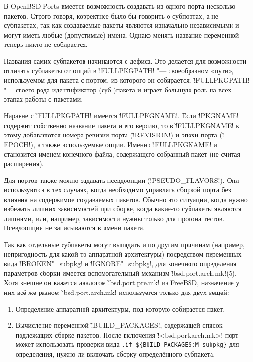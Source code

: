 \documentclass[10pt, a5paper]{article}
\begin{document}
В OpenBSD Ports имеется возможность создавать из одного порта несколько пакетов. Строго говоря, корректнее было бы говорить о субпортах, а не субпакетах, так как создаваемые пакеты являются изначально независимыми и могут иметь любые (допустимые) имена. Однако менять название переменной теперь никто не собирается.

Названия самих субпакетов начинаются с дефиса. Это делается для возможности отличать субпакеты от опций в \v!FULL\-PKG\-PATH! "--- своеобразном «пути», используемом для пакета с портом, из которого он собирается. \v!FULL\-PKG\-PATH! "--- своего рода идентификатор (суб-)пакета и играет большую роль на всех этапах работы с пакетами.

Наравне с \v!FULLPKGPATH! имеется \v!FULL\-PKG\-NAME!. Если \v!PKG\-NAME! содержит собственно название пакета и его версию, то в \v!FULL\-PKG\-NAME! к этому добавляются номера ревизии порта (\v!RE\-VI\-SI\-ON!) и эпохи порта (\v!EPOCH!), а также используемые опции. Именно \v!FULL\-PKG\-NAME! и становится именем конечного файла, содержащего собранный пакет (не считая расширения).

Для портов также можно задавать псевдоопции (\v!PSEUDO\_FLA\-VORS!). Они используются в тех случаях, когда необходимо управлять сборкой порта без влияния на содержимое создаваемых пакетов. Обычно это ситуации, когда нужно избежать лишних зависимостей при сборке, когда какие-то субпакеты являются лишними, или, например, зависимости нужны только для прогона тестов. Псевдоопции не записываются в имени пакета.

Так как отдельные субпакеты могут выпадать и по другим причинам (например, непригодность для какой-то аппаратной архитектуры) посредством переменных вида \v!BROKEN"=subpkg! и \v!IGNORE"=subpkg!, для конечного определения параметров сборки имеется \linebreak вспомогательный механизм \v!bsd.port.arch.mk!(5). Хотя внешне он кажется аналогом \v!bsd.port.pre.mk! из FreeBSD, назначение у них всё же разное: \v!bsd.port.arch.mk! используется только для двух вещей:
\begin{enumerate}
  \item Определение аппаратной архитектуры, под которую собирается пакет.
  \item Вычисление переменной \v!BUILD\_PA\-CKA\-GES!, содержащей список подлежащих сборке пакетов. После включения \linebreak \v!<bsd.port.arch.mk>! порт может использовать проверки вида \linebreak \texttt{.if \$\{BUILD\_PA\-CKA\-GES:M-subpkg\}} для определения, нужно ли включать сборку определённого субпакета.
\end{enumerate}
\end{document}

